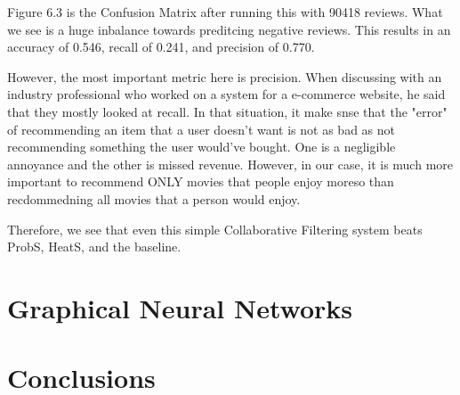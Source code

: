 \documentclass[12pt]{article}
\numberwithin{equation}{section}
\begin{document}
Figure 6.3 is the Confusion Matrix after running this with 90418 reviews. What we see is a huge inbalance towards preditcing negative reviews. This results in an accuracy of 0.546, recall of 0.241, and precision of 0.770.

However, the most important metric here is precision. When discussing with an industry professional who worked on a system for a e-commerce website, he said that they mostly looked at recall. In that situation, it make snse that the "error" of recommending an item that a user doesn't want is not as bad as not recommending something the user would've bought. One is a negligible annoyance and the other is missed revenue. However, in our case, it is much more important to recommend ONLY movies that people enjoy moreso than recdommedning all movies that a person would enjoy. 

Therefore, we see that even this simple Collaborative Filtering system beats ProbS, HeatS, and the baseline.
\section{Graphical Neural Networks}

\section{Conclusions}

\vspace{1em} 




\newpage



\printbibliography
\end{document}
